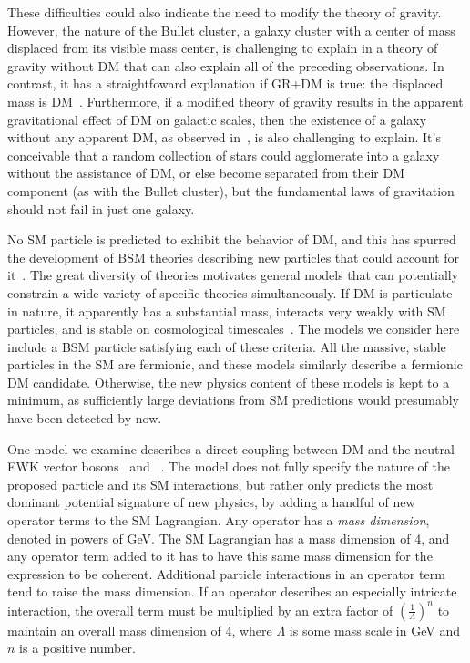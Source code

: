 \documentclass[oneside, letterpaper, 12pt, oldfontcommands]{memoir}
\begin{document}
These difficulties could also indicate the need to modify the theory of gravity.
However, the nature of the Bullet cluster, a galaxy cluster with a center of mass displaced from its visible mass center, is challenging to explain in a theory of gravity without DM that can also explain all of
the preceding observations. In contrast, it has a straightfoward explanation if GR+DM is true: the displaced mass is DM~\cite{ref:508162}. Furthermore, if a modified theory of gravity
results in the apparent gravitational effect of DM on galactic scales, then the existence of a galaxy without any apparent DM, as observed in~\cite{ref:nature25767}, is
also challenging to explain. It's conceivable that a random collection of stars could agglomerate into a galaxy without the assistance of DM, or else become separated from their
DM component (as with the Bullet cluster), but the fundamental laws of gravitation should not fail in just one galaxy.

No SM particle is predicted to exhibit the behavior of DM, and this has spurred the development
of BSM theories describing new particles that could account for it~\cite{ref:s41550-017-0059, ref:j.physrep.2004.08.031, ref:annurev.nucl.54.070103.181244, ref:S1062798717000783}.
The great diversity of theories motivates general models that can potentially constrain a wide variety of specific theories simultaneously.
If DM is particulate in nature, it apparently has a substantial mass, interacts very weakly with SM particles, and is stable on cosmological timescales~\cite{}.
The models we consider here include a BSM particle satisfying each of these criteria.
All the massive, stable particles in the SM are fermionic, and these models similarly describe a fermionic DM candidate. Otherwise, the new physics
content of these models is kept to a minimum, as sufficiently large deviations from SM predictions would presumably have been detected by now.

One model we examine describes a direct coupling between DM and the neutral EWK vector bosons \PZ\ and \Pgamma~\cite{ref:PhysRevD.89.056011}. The model does not fully specify
the nature of the proposed particle and its SM interactions, but rather only predicts the most dominant potential signature of new physics,
by adding a handful of new operator terms to the SM Lagrangian. Any operator has a \textit{mass dimension}, denoted in powers of GeV. The SM Lagrangian has
a mass dimension of 4, and any operator term added to it has to have this same mass dimension for the expression to be coherent.
Additional particle interactions in an operator term tend to raise the mass dimension. If an operator describes an especially intricate interaction,
the overall term must be multiplied by an extra factor of $(\frac{1}{\Lambda})^{n}$ to maintain an overall mass dimension of 4, where $\Lambda$ is some mass
scale in GeV and $n$ is a positive number.
\end{document}
